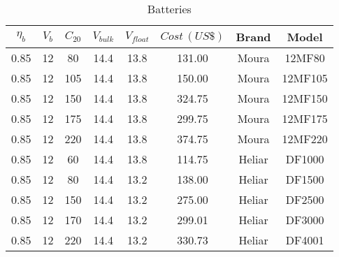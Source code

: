 \documentclass[journal,onecolumn]{IEEEtran}
\begin{document}

\begin{table}[h]
\renewcommand{\arraystretch}{1.3}
\caption{Batteries}\label{tab:battery}
\centering
\begin{scriptsize}
\begin{tabular}{c|c|c|c|c|c|c|c}
\hline
\hline
$\eta_{b}$  &  $V_{b}$  &  $C_{20}$  &  $V_{bulk}$  &  $V_{float}$  &  $Cost \, (US\$)$  &  Brand  &  Model \\
\hline
\hline
  0.85  &  12  &  80  &  14.4  &  13.8  &  131.00  &  Moura  &  12MF80  \\            
\hline
0.85 & 12 & 105 & 14.4 & 13.8 & 150.00 & Moura & 12MF105 \\
\hline
0.85 & 12 & 150 & 14.4 & 13.8 & 324.75 & Moura & 12MF150 \\
\hline
0.85 & 12 & 175 & 14.4 & 13.8 & 299.75 & Moura & 12MF175 \\
\hline
0.85 & 12 & 220 & 14.4 & 13.8 & 374.75 & Moura & 12MF220 \\
\hline
0.85 & 12 & 60 & 14.4 & 13.8 & 114.75 & Heliar & DF1000 \\     
\hline
0.85 & 12 & 80 & 14.4 & 13.2 & 138.00 & Heliar & DF1500 \\
\hline
0.85 & 12 & 150 & 14.4 & 13.2 & 275.00 & Heliar & DF2500 \\
\hline
0.85 & 12 & 170 & 14.4 & 13.2 & 299.01 & Heliar & DF3000 \\
\hline
0.85 & 12 & 220 & 14.4 & 13.2 & 330.73 & Heliar & DF4001 \\
\hline
\hline
\end{tabular}
\end{scriptsize}
\end{table}

\end{document}
